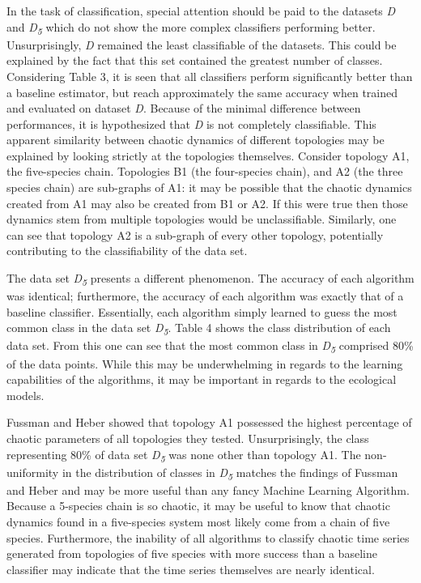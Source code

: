 \documentclass[letterpaper, 10 pt, conference]{ieeeconf}  %
\begin{document}
    In the task of classification, special attention should be paid to the datasets \textit{D} and \textit{D\textsubscript{5}} which do not show the more complex classifiers performing better. Unsurprisingly, \textit{D} remained the least classifiable of the datasets. This could be explained by the fact that this set contained the greatest number of classes. Considering Table 3, it is seen that all classifiers perform significantly better than a baseline estimator, but reach approximately the same accuracy when trained and evaluated on dataset \textit{D}. Because of the minimal difference between performances, it is hypothesized that \textit{D} is not completely classifiable. This apparent similarity between chaotic dynamics of different topologies may be explained by looking strictly at the topologies themselves. Consider topology A1, the five-species chain. Topologies B1 (the four-species chain), and A2 (the three species chain) are sub-graphs of A1: it may be possible that the chaotic dynamics created from A1 may also be created from B1 or A2. If this were true then those dynamics stem from multiple topologies would be unclassifiable. Similarly, one can see that topology A2 is a sub-graph of every other topology, potentially contributing to the classifiability of the data set. 

    The data set \textit{D\textsubscript{5}} presents a different phenomenon. The accuracy of each algorithm was identical; furthermore, the accuracy of each algorithm was exactly that of a baseline classifier. Essentially,  each algorithm simply learned to guess the most common class in the data set \textit{D\textsubscript{5}}. Table 4 shows the class distribution of each data set. From this one can see that the most common class in \textit{D\textsubscript{5}} comprised 80\% of the data points. While this may be underwhelming in regards to the learning capabilities of the algorithms, it may be important in regards to the ecological models. 

    Fussman and Heber showed that topology A1 possessed the highest percentage of chaotic parameters of all topologies they tested. Unsurprisingly, the class representing 80\% of data set \textit{D\textsubscript{5}} was none other than topology A1. The non-uniformity in the distribution of classes in \textit{D\textsubscript{5}} matches the findings of Fussman and Heber and may be more useful than any fancy Machine Learning Algorithm. Because a 5-species chain is so chaotic, it may be useful to know that chaotic dynamics found in a five-species system most likely come from a chain of five species. Furthermore, the inability of all algorithms to classify chaotic time series generated from topologies of five species with more success than a baseline classifier may indicate that the time series themselves are nearly identical. 
    
\end{document}
